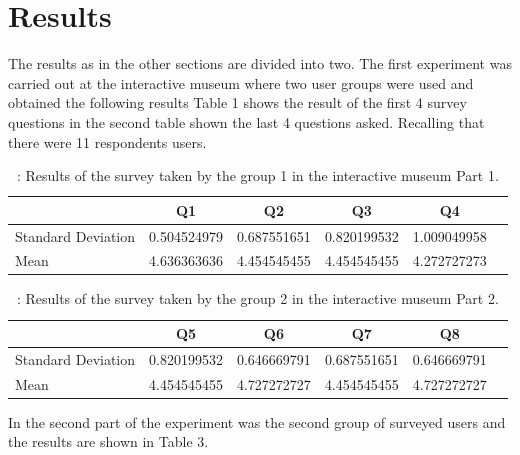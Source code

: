 \documentclass[journal]{IEEEtran}
\begin{document}
\section {Results}

The results as in the other sections are divided into two.
The first experiment was carried out at the interactive museum where two user groups were used and obtained the following results Table 1 shows the result of the first 4 survey questions in the second table shown the last 4 questions asked. Recalling that there were 11 respondents users.



\begin{table}[H]
\caption{: Results of the survey taken by the group 1 in the interactive museum Part 1. }
\begin{tabular}{l*{4}{c}r}
									& Q1 & Q2 & Q3 & Q4  \\
\hline
Standard Deviation & 0.504524979	& 0.687551651	& 0.820199532	& 1.009049958	\\
Mean & 4.636363636	& 4.454545455	& 4.454545455	& 4.272727273	 \\
\hline
\end{tabular}	
\end{table}

\begin{table}[H]
\caption{: Results of the survey taken by the group 2 in the interactive museum Part 2. }
\begin{tabular}{l*{4}{c}r}
									& Q5 & Q6 & Q7 & Q8 \\
\hline
Standard Deviation & 0.820199532	& 0.646669791	& 0.687551651	& 0.646669791 \\
Mean & 4.454545455	& 4.727272727	& 4.454545455	& 4.727272727 \\
\hline
\end{tabular}	
 
\end{table}
 
In the second part of the experiment was the second group of surveyed users and the results are shown in Table 3.
\end{document}
